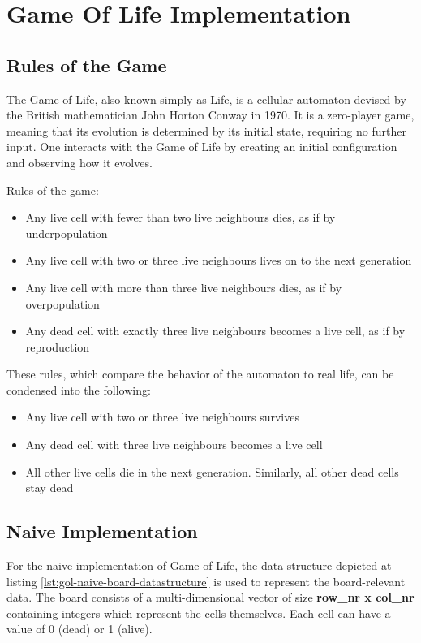 \documentclass[a4paper,english,12pt,twoside=false]{scrartcl} %
\begin{document}
\section{Game Of Life Implementation}

\subsection{Rules of the Game}

The Game of Life, also known simply as Life, is a cellular automaton devised by the British mathematician John Horton Conway in 1970. It is a zero-player game, meaning that its evolution is determined by its initial state, requiring no further input. One interacts with the Game of Life by creating an initial configuration and observing how it evolves.

\breakln

Rules of the game:

\begin{itemize}
	\item{Any live cell with fewer than two live neighbours dies, as if by underpopulation}
	\item{Any live cell with two or three live neighbours lives on to the next generation}
	\item{Any live cell with more than three live neighbours dies, as if by overpopulation}
	\item{Any dead cell with exactly three live neighbours becomes a live cell, as if by reproduction}
\end{itemize}

These rules, which compare the behavior of the automaton to real life, can be condensed into the following:

\begin{itemize}
	\item{Any live cell with two or three live neighbours survives}
	\item{Any dead cell with three live neighbours becomes a live cell}
	\item{All other live cells die in the next generation. Similarly, all other dead cells stay dead}
\end{itemize}

\subsection{Naive Implementation}

For the naive implementation of Game of Life, the data structure depicted at listing \ref{lst:gol-naive-board-datastructure} is used to represent the board-relevant data. The board consists of a multi-dimensional vector of size \textbf{row{\_}nr x col{\_}nr}  containing integers which represent the cells themselves. Each cell can have a value of 0 (dead) or 1 (alive).
\end{document}
